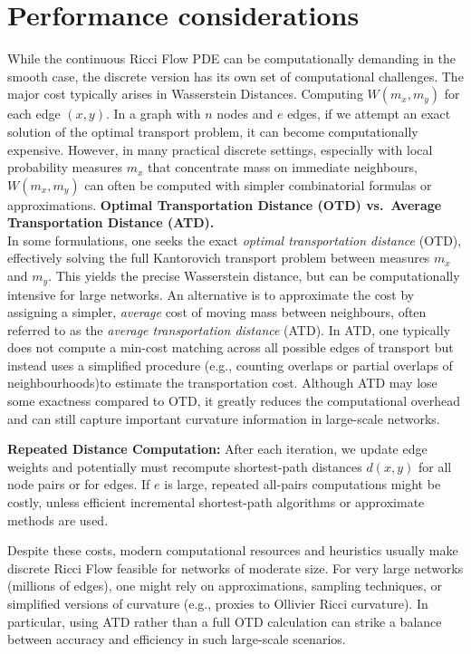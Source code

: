 
\section{Performance considerations}
\label{sec:ricci_flow_networks_performance}

While the continuous Ricci Flow PDE can be computationally demanding in the smooth case, the discrete version has its own set of computational challenges. The major cost typically arises in Wasserstein Distances. Computing $W(m_x, m_y)$ for each edge $(x,y)$. In a graph with $n$ nodes and $e$ edges, if we attempt an exact solution of the optimal transport problem, it can become computationally expensive. However, in many practical discrete settings, especially with local probability measures $m_x$ that concentrate mass on immediate neighbours, $W(m_x,m_y)$ can often be computed with simpler combinatorial formulas or approximations. 
\color{red}
\textbf{Optimal Transportation Distance (OTD) vs.\ Average Transportation Distance (ATD).}
\\\color{black}
In some formulations, one seeks the exact \emph{optimal transportation distance} (OTD), effectively solving the full Kantorovich transport problem between measures $m_x$ and $m_y$. This yields the precise Wasserstein distance, but can be computationally intensive for large networks. An alternative is to approximate the cost by assigning a simpler, \emph{average} cost of moving mass between neighbours, often referred to as the \emph{average transportation distance} (ATD). In ATD, one typically does not compute a min-cost matching across all possible edges of transport but instead uses a simplified procedure (e.g., counting overlaps or partial overlaps of neighbourhoods)to estimate the transportation cost. Although ATD may lose some exactness compared to OTD, it greatly reduces the computational overhead and can still capture important curvature information in large-scale networks.

\color{red}
\textbf{Repeated Distance Computation:} After each iteration, we update edge weights and potentially must recompute shortest-path distances $d(x,y)$ for all node pairs or for edges. If $e$ is large, repeated all-pairs computations might be costly, unless efficient incremental shortest-path algorithms or approximate methods are used.
\color{black}


Despite these costs, modern computational resources and heuristics usually make discrete Ricci Flow feasible for networks of moderate size. For very large networks (millions of edges), one might rely on approximations, sampling techniques, or simplified versions of curvature (e.g., proxies to Ollivier Ricci curvature). In particular, using ATD rather than a full OTD calculation can strike a balance between accuracy and efficiency in such large-scale scenarios.



